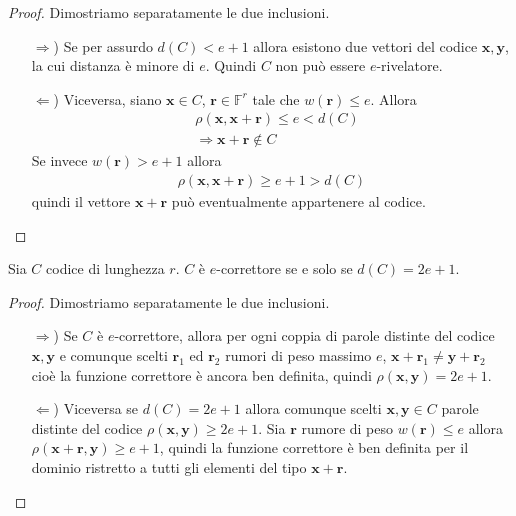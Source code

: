 \begin{proof} 
   Dimostriamo separatamente le due inclusioni.
   \begin{itemize}
   \item[$\Rightarrow$)] Se per assurdo $d(C) < e+1 $ allora esistono due vettori del codice $\mathbf{x}, \mathbf{y}$, la cui distanza è minore di $e$. Quindi $C$ non può essere $e$-rivelatore. 
   \item[$\Leftarrow$)] Viceversa, siano $\mathbf{x} \in C$, $\mathbf{r} \in \mathbb{F}^{r}$ tale che $w(\mathbf{r}) \leq e$. Allora
   \begin{align*}
     &\rho(\mathbf{x}, \mathbf{x}+\mathbf{r}) \leq e < d(C) \\
     &\Rightarrow \mathbf{x}+\mathbf{r} \notin C 
   \end{align*}
   Se invece $w(\mathbf{r}) > e + 1$ allora
   \begin{align*}
     \rho(\mathbf{x}, \mathbf{x}+\mathbf{r}) \geq e+1 > d(C)
   \end{align*}
   quindi il vettore $\mathbf{x}+\mathbf{r}$ può eventualmente appartenere al codice.
\end{itemize}
\end{proof}

\begin{prop}\label{cap2_1:propcodici2}
   Sia $C$ codice di lunghezza $r$. $C$ è $e$-correttore se e solo se $d(C)= 2e+1$.
\end{prop}
\begin{proof}
   Dimostriamo separatamente le due inclusioni. 
   \begin{itemize}
   \item[$\Rightarrow$)] Se $C$ è $e$-correttore, allora per ogni coppia di parole distinte del codice $\mathbf{x}, \mathbf{y}$ e comunque scelti $\mathbf{r}_{1}$ ed $\mathbf{r}_{2}$ rumori di peso massimo $e$, $\mathbf{x}+\mathbf{r}_{1} \neq \mathbf{y}+\mathbf{r}_{2}$ cioè la funzione correttore è ancora ben definita,  quindi $\rho(\mathbf{x},\mathbf{y}) = 2e + 1$.
   \item[$\Leftarrow$)] Viceversa se $d(C) = 2e + 1$ allora comunque scelti $\mathbf{x}, \mathbf{y} \in C$ parole distinte del codice $\rho(\mathbf{x},\mathbf{y}) \geq 2e+1$. Sia $\mathbf{r}$ rumore di peso $w(\mathbf{r}) \leq e$ allora $\rho(\mathbf{x} + \mathbf{r},\mathbf{y}) \geq e+1$, quindi la funzione correttore è ben definita per il dominio ristretto a tutti gli elementi del tipo $\mathbf{x} + \mathbf{r}$.
\end{itemize}
\end{proof}

